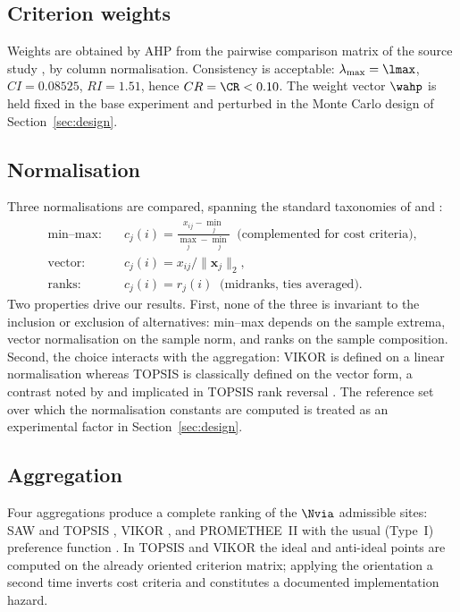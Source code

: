 \subsection{Criterion weights}

Weights are obtained by AHP \citep{Saaty1990,Saaty2008} from the pairwise
comparison matrix of the source study \citep{Andrade2015}, by column
normalisation.
Consistency is acceptable: $\lambda_{\max}=\lmax$, $CI=0.08525$,
$RI=1.51$, hence $CR=\CR<0.10$.
The weight vector $\wahp$ is held fixed in the base experiment and
perturbed in the Monte Carlo design of Section~\ref{sec:design}.

\subsection{Normalisation}

Three normalisations are compared, spanning the standard taxonomies of
\citet{Jahan2015} and \citet{Aytekin2021}:
\begin{align}
  \text{min--max:} \quad &
    c_j(i) = \frac{x_{ij}-\min_j}{\max_j-\min_j}
    \;\;\text{(complemented for cost criteria),} \label{eq:mm} \\
  \text{vector:} \quad &
    c_j(i) = x_{ij} \big/ \lVert\mathbf{x}_j\rVert_2, \label{eq:vec} \\
  \text{ranks:} \quad &
    c_j(i) = r_j(i) \;\;\text{(midranks, ties averaged).} \label{eq:ranks}
\end{align}
Two properties drive our results.
First, none of the three is invariant to the inclusion or exclusion of
alternatives: min--max depends on the sample extrema, vector normalisation
on the sample norm, and ranks on the sample composition.
Second, the choice interacts with the aggregation: VIKOR is defined on a
linear normalisation whereas TOPSIS is classically defined on the vector
form, a contrast noted by \citet{OpricovicTzeng2004} and implicated in
TOPSIS rank reversal \citep{GarciaCascales2012,Kuo2017}.
The reference set over which the normalisation constants are computed is
treated as an experimental factor in Section~\ref{sec:design}.

\subsection{Aggregation}

Four aggregations produce a complete ranking of the $\Nvia$ admissible
sites: SAW and TOPSIS \citep{Hwang1981}, VIKOR \citep{OpricovicTzeng2004},
and PROMETHEE~II with the usual (Type~I) preference function
\citep{Brans1986,Mareschal2008}.
In TOPSIS and VIKOR the ideal and anti-ideal points are computed on the
already oriented criterion matrix; applying the orientation a second time
inverts cost criteria and constitutes a documented implementation hazard.


